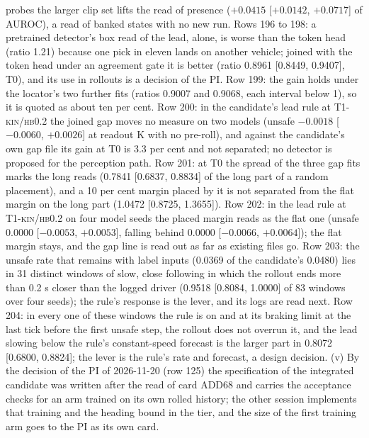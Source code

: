 \documentclass[10pt,twocolumn]{article}
\theoremstyle{remark}
\newcommand{\tier}[1]{\textsc{\small #1}}
\begin{document}
probes the larger clip set lifts the read of presence ($+0.0415$ [$+0.0142$, $+0.0717$] of AUROC), a read of banked states with no new run. Rows 196 to 198: a pretrained detector's box read of the lead, alone, is worse than the token head (ratio 1.21) because one pick in eleven lands on another vehicle; joined with the token head under an agreement gate it is better (ratio 0.8961 [0.8449, 0.9407], \tier{T0}), and its use in rollouts is a decision of the PI. Row 199: the gain holds under the locator's two further fits (ratios 0.9007 and 0.9068, each interval below 1), so it is quoted as about ten per cent. Row 200: in the candidate's lead rule at \tier{T1-kin/hb0.2} the joined gap moves no measure on two models (unsafe $-0.0018$ [$-0.0060$, $+0.0026$] at readout K with no pre-roll), and against the candidate's own gap file its gain at \tier{T0} is 3.3 per cent and not separated; no detector is proposed for the perception path. Row 201: at \tier{T0} the spread of the three gap fits marks the long reads (0.7841 [0.6837, 0.8834] of the long part of a random placement), and a 10 per cent margin placed by it is not separated from the flat margin on the long part (1.0472 [0.8725, 1.3655]). Row 202: in the lead rule at \tier{T1-kin/hb0.2} on four model seeds the placed margin reads as the flat one (unsafe 0.0000 [$-0.0053$, $+0.0053$], falling behind 0.0000 [$-0.0066$, $+0.0064$]); the flat margin stays, and the gap line is read out as far as existing files go. Row 203: the unsafe rate that remains with label inputs (0.0369 of the candidate's 0.0480) lies in 31 distinct windows of slow, close following in which the rollout ends more than 0.2 s closer than the logged driver (0.9518 [0.8084, 1.0000] of 83 windows over four seeds); the rule's response is the lever, and its logs are read next. Row 204: in every one of these windows the rule is on and at its braking limit at the last tick before the first unsafe step, the rollout does not overrun it, and the lead slowing below the rule's constant-speed forecast is the larger part in 0.8072 [0.6800, 0.8824]; the lever is the rule's rate and forecast, a design decision. (v) By the decision of the PI of 2026-11-20 (row 125) the specification of the integrated candidate was written after the read of card ADD68 and carries the acceptance checks for an arm trained on its own rolled history; the other session implements that training and the heading bound in the tier, and the size of the first training arm goes to the PI as its own card.
\end{document}
